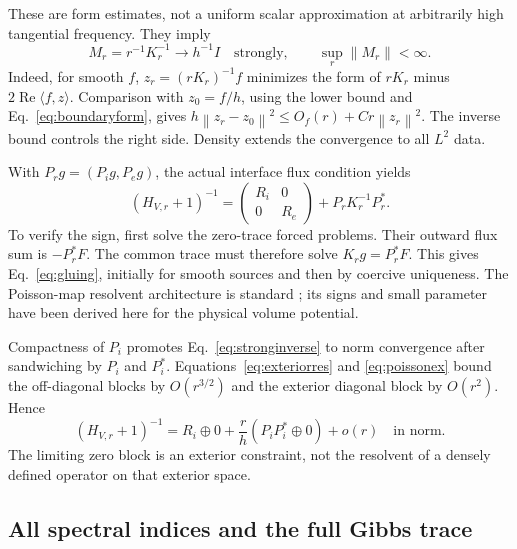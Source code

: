 \documentclass[aps,pra,reprint,superscriptaddress,longbibliography]{revtex4-2}
\newcommand{\norm}[1]{\left\lVert#1\right\rVert}
\begin{document}
These are form estimates, not a uniform scalar approximation at arbitrarily high tangential frequency. They imply
\begin{equation}
 M_r=r^{-1}K_r^{-1}\longrightarrow h^{-1}I
 \quad\text{strongly},\qquad \sup_r\norm{M_r}<\infty.\label{eq:stronginverse}
\end{equation}
Indeed, for smooth $f$, $z_r=(rK_r)^{-1}f$ minimizes the form of $rK_r$ minus $2\operatorname{Re}\langle f,z\rangle$. Comparison with $z_0=f/h$, using the lower bound and Eq.~\eqref{eq:boundaryform}, gives $h\norm{z_r-z_0}^2\le O_f(r)+Cr\norm{z_r}^2$. The inverse bound controls the right side. Density extends the convergence to all $L^2$ data.

With $P_rg=(P_ig,P_eg)$, the actual interface flux condition yields
\begin{equation}
 (H_{V,r}+1)^{-1}=
 \begin{pmatrix}R_i&0\\0&R_e\end{pmatrix}+P_rK_r^{-1}P_r^*.
 \label{eq:gluing}
\end{equation}
To verify the sign, first solve the zero-trace forced problems. Their outward flux sum is $-P_r^*F$. The common trace must therefore solve $K_rg=P_r^*F$. This gives Eq.~\eqref{eq:gluing}, initially for smooth sources and then by coercive uniqueness. The Poisson-map resolvent architecture is standard \cite{GesztesyMitrea}; its signs and small parameter have been derived here for the physical volume potential.

Compactness of $P_i$ promotes Eq.~\eqref{eq:stronginverse} to norm convergence after sandwiching by $P_i$ and $P_i^*$. Equations~\eqref{eq:exteriorres} and \eqref{eq:poissonex} bound the off-diagonal blocks by $O(r^{3/2})$ and the exterior diagonal block by $O(r^2)$. Hence
\begin{equation}
 (H_{V,r}+1)^{-1}=R_i\oplus0+
          \frac r h(P_iP_i^*\oplus0)+o(r)
 \quad\text{in norm}.\label{eq:resolventexp}
\end{equation}
The limiting zero block is an exterior constraint, not the resolvent of a densely defined operator on that exterior space.

\subsection{All spectral indices and the full Gibbs trace}
\end{document}
